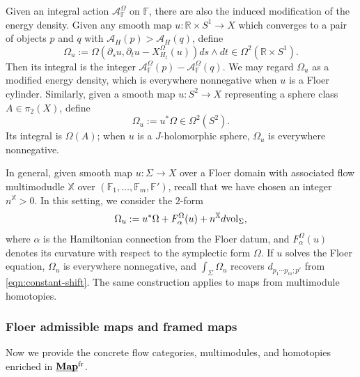 \documentclass[reqno, 10pt]{amsart}
\numberwithin{equation}{section}
\numberwithin{equation}{section}
\theoremstyle{definition}
\theoremstyle{remark}
\newcommand{\beq}{\begin{equation}}
\newcommand{\eeq}{\end{equation}}
\newcommand{\beqn}{\begin{equation*}}
\newcommand{\eeqn}{\end{equation*}}
\newcommand{\mb}{\mathbb}
\newcommand{\mc}{\mathcal}
\newcommand{\uds}[1]{\underline{\smash{#1}}}
\begin{document}
Given an integral action ${\mc A}_{\mb{F}}^\Omega$ on ${\mb F}$, there are also the induced modification of the energy density. Given any smooth map $u: {\mb R}\times S^1 \to X$ which converges to a pair of objects $p$ and $q$ with ${\mc A}_H(p) > {\mc A}_H(q)$, define 
\beq\label{integral_energy_density}
\Omega_u:= \Omega( \partial_s u, \partial_t u - X^{\Omega}_{H_t}(u)) ds \wedge dt \in \Omega^2({\mb R}\times S^1).
\eeq
Then its integral is the integer ${\mc A}_{\mb F}^\Omega(p) - {\mc A}_{\mb F}^\Omega(q)$. We may regard $\Omega_u$ as a modified energy density, which is everywhere nonnegative when $u$ is a Floer cylinder. Similarly, given a smooth map $u: S^2 \to X$ representing a sphere class $A \in \pi_2(X)$, define
\beqn
\Omega_u:= u^* \Omega \in \Omega^2(S^2).
\eeqn
Its integral is $\Omega(A)$; when $u$ is a $J$-holomorphic sphere, $\Omega_u$ is everywhere nonnegative.

In general, given smooth map $u: \Sigma \to X$ over a Floer domain with associated flow multimodudle ${\mb X}$ over $({\mb F}_1, \dots, {\mb F}_m, {\mb F}')$, recall that we have chosen an integer $n^{\mb X} > 0$. In this setting, we consider the $2$-form
\beqn
\Omega_u := u^* \Omega + F^{\Omega}_{\alpha}(u) + n^{\mb X} d{\rm vol}_{\Sigma},
\eeqn
where $\alpha$ is the Hamiltonian connection from the Floer datum, and $F^{\Omega}_{\alpha}(u)$ denotes its curvature with respect to the symplectic form $\Omega$. If $u$ solves the Floer equation, $\Omega_u$ is everywhere nonnegative, and $\int_{\Sigma} \Omega_u$ recovers $d_{p_1 \cdots p_m;p'}$ from \eqref{eqn:constant-shift}. The same construction applies to maps from multimodule homotopies.



\subsubsection{Floer admissible maps
and framed maps}

Now we provide the concrete flow categories, multimodules, and homotopies enriched in $\uds{\bf Map}^{\rm fr}$. 
\end{document}
